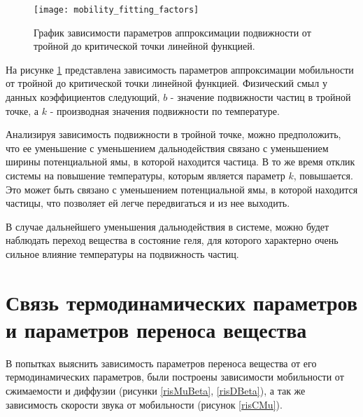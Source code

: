 \begin{figure}[h]
\begin{center}
\texttt{[image: mobility\_fitting\_factors]}
\caption{График зависимости параметров аппроксимации подвижности от тройной до критической точки линейной функцией.}
\label{risDmu}
\end{center}
\end{figure}

На рисунке \ref{risDmu} представлена зависимость параметров аппроксимации мобильности от тройной до критической точки линейной функцией. Физический смыл у данных коэффициентов следующий, $b$ - значение подвижности частиц в тройной точке, а $k$ - производная значения подвижности по температуре. 

Анализируя зависимость подвижности в тройной точке, можно предположить, что ее уменьшение с уменьшением дальнодействия связано с уменьшением ширины потенциальной ямы, в которой находится частица. В то же время отклик системы на повышение температуры, которым является параметр $k$, повышается. Это может быть связано с уменьшением потенциальной ямы, в которой находится частицы, что позволяет ей легче передвигаться и из нее выходить.

В случае дальнейшего уменьшения дальнодействия в системе, можно будет наблюдать переход вещества в состояние геля, для которого характерно очень сильное влияние температуры на подвижность частиц.


\section{Связь термодинамических параметров и параметров переноса вещества}\label{C3_2}

В попытках выяснить зависимость параметров переноса вещества от его термодинамических параметров, были построены зависимости мобильности от сжимаемости и диффузии (рисунки \ref{risMuBeta}, \ref{risDBeta}), а так же зависимость скорости звука от мобильности (рисунок \ref{risCMu}).

